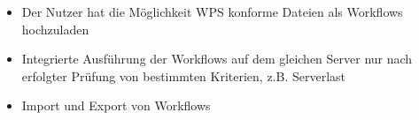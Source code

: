         \begin{itemize}
            \item Der Nutzer hat die Möglichkeit WPS konforme Dateien als Workflows hochzuladen
            
            \item Integrierte Ausführung der Workflows auf dem gleichen Server nur nach erfolgter Prüfung von bestimmten Kriterien, z.B. Serverlast
            \item Import und Export von Workflows
        \end{itemize}